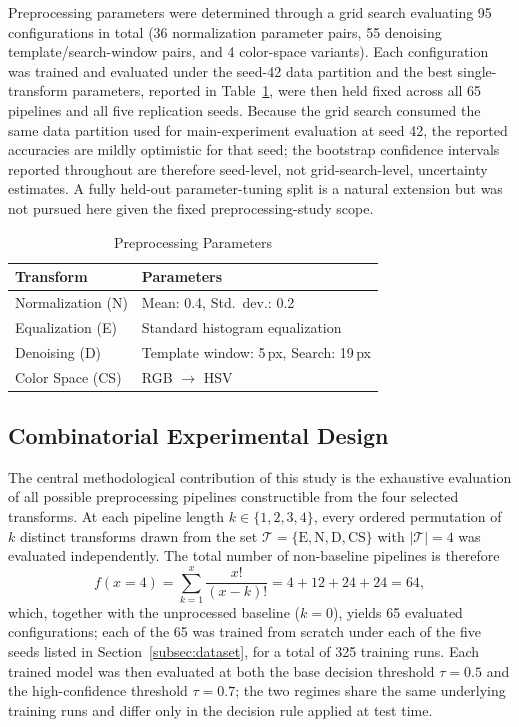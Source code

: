 \documentclass[preprint,5p,times,twocolumn]{elsarticle}
\begin{document}
Preprocessing parameters were determined through a grid search evaluating 95 configurations in total (36 normalization parameter pairs, 55 denoising template/search-window pairs, and 4 color-space variants). Each configuration was trained and evaluated under the seed-42 data partition and the best single-transform parameters, reported in Table~\ref{tab:params}, were then held fixed across all 65 pipelines and all five replication seeds. Because the grid search consumed the same data partition used for main-experiment evaluation at seed 42, the reported accuracies are mildly optimistic for that seed; the bootstrap confidence intervals reported throughout are therefore seed-level, not grid-search-level, uncertainty estimates. A fully held-out parameter-tuning split is a natural extension but was not pursued here given the fixed preprocessing-study scope.

\begin{table}[!t]
\caption{Preprocessing Parameters\label{tab:params}}
\centering
\begin{tabular}{l l}
\toprule
\textbf{Transform} & \textbf{Parameters} \\
\midrule
Normalization (N) & Mean: 0.4, Std.\ dev.: 0.2 \\
Equalization (E) & Standard histogram equalization \\
Denoising (D)  & Template window: 5\,px, Search: 19\,px \\
Color Space (CS) & RGB $\to$ HSV \\
\bottomrule
\end{tabular}
\end{table}

\subsection{Combinatorial Experimental Design}

The central methodological contribution of this study is the exhaustive evaluation of all possible preprocessing pipelines constructible from the four selected transforms. At each pipeline length $k \in \{1, 2, 3, 4\}$, every ordered permutation of $k$ distinct transforms drawn from the set $\mathcal{T} = \{\text{E}, \text{N}, \text{D}, \text{CS}\}$ with $|\mathcal{T}| = 4$ was evaluated independently. The total number of non-baseline pipelines is therefore
\begin{equation}
f(x=4) = \sum_{k=1}^{x} \frac{x!}{(x - k)!} = 4 + 12 + 24 + 24 = 64,
\label{eq:combinatorics}
\end{equation}
which, together with the unprocessed baseline ($k=0$), yields 65 evaluated configurations; each of the 65 was trained from scratch under each of the five seeds listed in Section~\ref{subsec:dataset}, for a total of 325 training runs. Each trained model was then evaluated at both the base decision threshold $\tau = 0.5$ and the high-confidence threshold $\tau = 0.7$; the two regimes share the same underlying training runs and differ only in the decision rule applied at test time.
\end{document}
